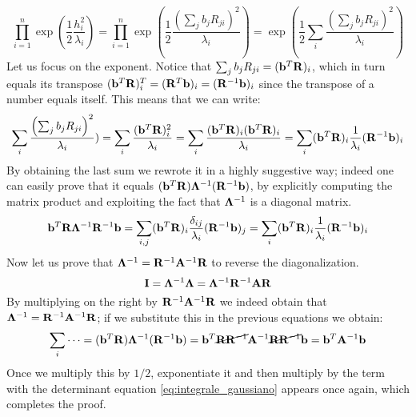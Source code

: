 \documentclass[a4paper]{article}
\newcommand{\mat}[1]{\vb{#1}}
\begin{document}
\begin{equation*}
    \prod_{i=1}^n \exp(\frac{1}{2}\frac{h_i^2}{\lambda_i}) = \prod_{i=1}^n \exp(\frac{1}{2}\frac{\left(\sum_j b_j R_{ji}\right)^2}{\lambda_i}) = \exp(\frac{1}{2} \sum_i \frac{\left(\sum_j b_j R_{ji}\right)^2}{\lambda_i})
\end{equation*}
Let us focus on the exponent. Notice that $\sum_j b_j R_{ji} = (\vb{b}^T \mat{R})_i$, which in turn equals its transpose $(\vb{b}^T\mat{R})^T_i = (\mat{R}^T \vb{b})_i = (\mat{R}^{-1} \vb{b})_i$ since the transpose of a number equals itself. This means that we can write:
\begin{equation*}
    \sum_i \frac{\left(\sum_j b_j R_{ji}\right)^2}{\lambda_i}) = \sum_i \frac{(\vb{b}^T\mat{R})_i^2}{\lambda_i} = \sum_i \frac{(\vb{b}^T\mat{R})_i(\vb{b}^T\mat{R})_i}{\lambda_i} = \sum_i (\vb{b}^T\mat{R})_i\frac{1}{\lambda_i}(\mat{R}^{-1} \vb{b})_i
\end{equation*}
By obtaining the last sum we rewrote it in a highly suggestive way; indeed one can easily prove that it equals $(\vb{b}^T\mat{R})\mat{\Lambda}^{-1}(\mat{R}^{-1}\vb{b})$, by explicitly computing the matrix product and exploiting the fact that $\mat{\Lambda}^{-1}$ is a diagonal matrix.
\begin{equation*}
    \vb{b}^T\mat{R}\mat{\Lambda}^{-1}\mat{R}^{-1}\vb{b} = \sum_{i,j} (\vb{b}^T\mat{R})_i\frac{\delta_{ij}}{\lambda_i}(\mat{R}^{-1} \vb{b})_j = \sum_i (\vb{b}^T\mat{R})_i\frac{1}{\lambda_i}(\mat{R}^{-1} \vb{b})_i
\end{equation*}
Now let us prove that $\mat{\Lambda}^{-1} = \mat{R}^{-1} \mat{A}^{-1} \mat{R}$ to reverse the diagonalization.
\begin{equation*}
    \mat{I} = \mat{\Lambda}^{-1}\mat{\Lambda} = \mat{\Lambda}^{-1} \mat{R}^{-1} \mat{A} \mat{R}
\end{equation*}
By multiplying on the right by $\mat{R}^{-1} \mat{A}^{-1} \mat{R}$ we indeed obtain that $\mat{\Lambda}^{-1} = \mat{R}^{-1} \mat{A}^{-1} \mat{R}$; if we substitute this in the previous equations we obtain:
\begin{equation*}
    \sum_i \dots = (\vb{b}^T\mat{R})\mat{\Lambda}^{-1}(\mat{R}^{-1}\vb{b}) = \vb{b}^T\cancel{\mat{R}\mat{R}^{-1}} \mat{A}^{-1} \cancel{\mat{R}\mat{R}^{-1}}\vb{b} = \vb{b}^T \mat{A}^{-1}\vb{b}
\end{equation*}
Once we multiply this by $1/2$, exponentiate it and then multiply by the term with the determinant equation \eqref{eq:integrale_gaussiano} appears once again, which completes the proof.
\end{document}
